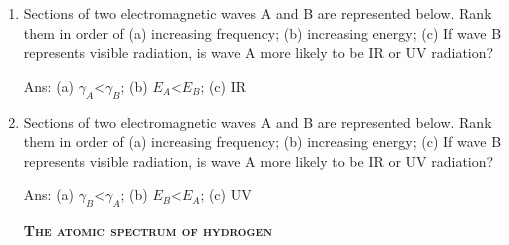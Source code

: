 \documentclass[main.tex]{subfiles}
\begin{document}
\begin{multicols*}{2}
\begin{enumerate}
\item Sections of two electromagnetic waves A and B  are represented below. Rank them in order of (a) increasing frequency; (b) increasing energy;  (c) If wave B represents visible radiation, is wave A more likely to be IR or UV radiation?  
     \begin{centering}
     \end{centering}
  \begin{flushright}\small Ans: (a) $\gamma_A$<$\gamma_B$; (b) $E_A$<$E_B$; (c) IR \end{flushright}

\item Sections of two electromagnetic waves A and B  are represented below. Rank them in order of (a) increasing frequency; (b) increasing energy;  (c) If wave B represents visible radiation, is wave A more likely to be IR or UV radiation?  
     \begin{centering}
     \end{centering}
  \begin{flushright}\small Ans: (a) $\gamma_B$<$\gamma_A$; (b) $E_B$<$E_A$; (c) UV \end{flushright}
    
     
{\raggedright\textsc{\textbf{The atomic spectrum of hydrogen }}\par}


\end{enumerate}
\end{multicols*}
\end{document}

